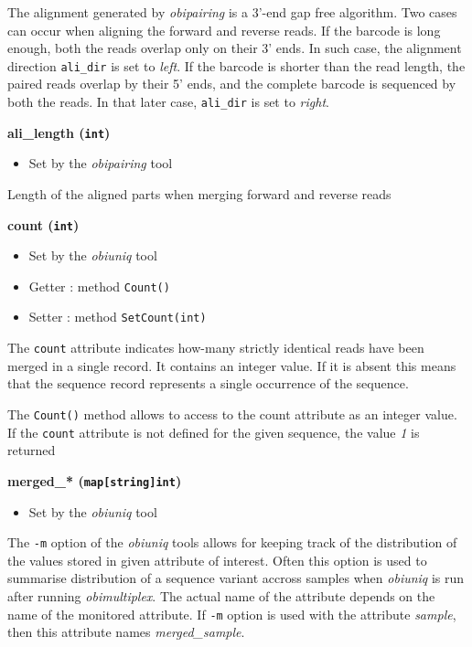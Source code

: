 \documentclass[
  letterpaper,
  DIV=11,
  numbers=noendperiod]{scrreprt}
\providecommand{\tightlist}{%
  \setlength{\itemsep}{0pt}\setlength{\parskip}{0pt}}\usepackage{longtable,booktabs,array}
\begin{document}
The alignment generated by \emph{obipairing} is a 3'-end gap free
algorithm. Two cases can occur when aligning the forward and reverse
reads. If the barcode is long enough, both the reads overlap only on
their 3' ends. In such case, the alignment direction \texttt{ali\_dir}
is set to \emph{left}. If the barcode is shorter than the read length,
the paired reads overlap by their 5' ends, and the complete barcode is
sequenced by both the reads. In that later case, \texttt{ali\_dir} is
set to \emph{right}.

\textbf{ali\_length (\texttt{int})}

\begin{itemize}
\tightlist
\item
  Set by the \emph{obipairing} tool
\end{itemize}

Length of the aligned parts when merging forward and reverse reads

\textbf{count (\texttt{int})}

\begin{itemize}
\tightlist
\item
  Set by the \emph{obiuniq} tool
\item
  Getter : method \texttt{Count()}
\item
  Setter : method \texttt{SetCount(int)}
\end{itemize}

The \texttt{count} attribute indicates how-many strictly identical reads
have been merged in a single record. It contains an integer value. If it
is absent this means that the sequence record represents a single
occurrence of the sequence.

The \texttt{Count()} method allows to access to the count attribute as
an integer value. If the \texttt{count} attribute is not defined for the
given sequence, the value \emph{1} is returned

\textbf{merged\_* (\texttt{map{[}string{]}int})}

\begin{itemize}
\tightlist
\item
  Set by the \emph{obiuniq} tool
\end{itemize}

The \texttt{-m} option of the \emph{obiuniq} tools allows for keeping
track of the distribution of the values stored in given attribute of
interest. Often this option is used to summarise distribution of a
sequence variant accross samples when \emph{obiuniq} is run after
running \emph{obimultiplex}. The actual name of the attribute depends on
the name of the monitored attribute. If \texttt{-m} option is used with
the attribute \emph{sample}, then this attribute names
\emph{merged\_sample}.
\end{document}
